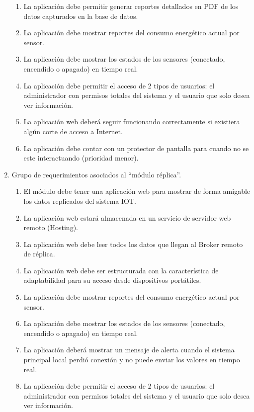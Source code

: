 \documentclass[11pt]{charter}
\begin{document}
\begin{enumerate}
\begin{enumerate}
	\item La aplicación debe permitir generar reportes detallados en PDF de los datos capturados en la base de datos.
	\item La aplicación debe mostrar reportes del consumo energético actual por sensor.
	\item La aplicación debe mostrar los estados de los sensores (conectado, encendido o apagado) en tiempo real.	
	\item La aplicación debe permitir el acceso de 2 tipos de usuarios: el administrador con permisos totales del sistema y el usuario que solo desea ver información.
	\item La aplicación web deberá seguir funcionando correctamente si existiera algún corte de acceso a Internet.
	\item La aplicación debe contar con un protector de pantalla para cuando no se este interactuando (prioridad menor).
	\end{enumerate}
\item Grupo de requerimientos asociados al ``módulo réplica''.
	\begin{enumerate}
	\item El módulo debe tener una aplicación web para mostrar de forma amigable los datos replicados del sistema IOT.
	\item La aplicación web estará almacenada en un servicio de servidor web remoto (Hosting).
	\item La aplicación web debe leer todos los datos que llegan al Broker remoto de réplica.
	\item La aplicación web debe ser estructurada con la característica de adaptabilidad para su acceso desde dispositivos portátiles.
	\item La aplicación debe mostrar reportes del consumo energético actual por sensor.
	\item La aplicación debe mostrar los estados de los sensores (conectado, encendido o apagado) en tiempo real.	
	\item La aplicación deberá mostrar un mensaje de alerta cuando el sistema principal local perdió conexión y no puede enviar los valores en tiempo real.
	\item La aplicación debe permitir el acceso de 2 tipos de usuarios: el administrador con permisos totales del sistema y el usuario que solo desea ver información.
	\end{enumerate}

\end{enumerate}
\end{document}
